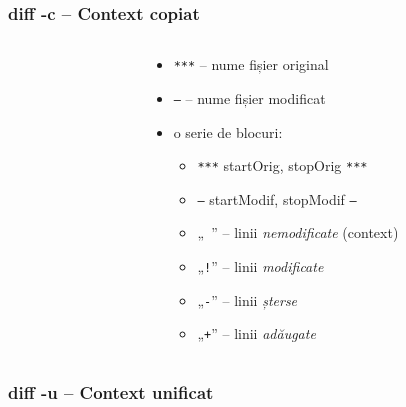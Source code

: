 \documentclass{beamer}
\begin{document}
\begin{frame}
  \frametitle{\textbf{diff -c} – Context copiat}
  \begin{columns}

    \begin{column}{6cm}
      \footnotesize \tt 
    \end{column}

    \begin{column}{10cm}
      \begin{itemize}
      \item \texttt{\texttt{***}} – nume fișier original
      \item \texttt{\texttt{---}} – nume fișier modificat
      \item o serie de blocuri:
        \begin{itemize}
        \item \texttt{***} startOrig, stopOrig \texttt{***}
        \item \texttt{---} startModif, stopModif \texttt{---}
        \item „\texttt{ }” – linii \textit{nemodificate} (context)
        \item „\texttt{!}” – linii \textit{modificate}
        \item „\texttt{-}” – linii \textit{șterse}
        \item „\texttt{+}” – linii \textit{adăugate}
        \end{itemize}
      \end{itemize}
    \end{column}

  \end{columns}
\end{frame}

\begin{frame}
  \frametitle{\textbf{diff -u} – Context unificat}
  \tt{}
\end{frame}
\end{document}
